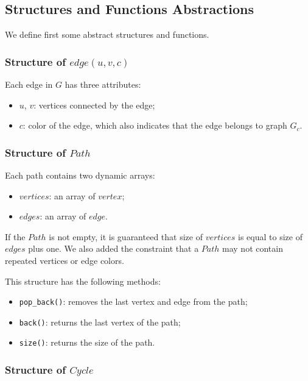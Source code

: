 \subsection{Structures and Functions Abstractions}


We define first some abstract structures and functions.

\subsubsection{Structure of $edge(u, v, c)$}

Each edge in $G$ has three attributes:

\begin{itemize}
    \item $u$, $v$: vertices connected by the edge;
    \item $c$: color of the edge, which also indicates that the edge belongs to graph $G_c$.
\end{itemize}

\subsubsection{Structure of $Path$}

Each path contains two dynamic arrays:

\begin{itemize}
    \item $vertices$: an array of $vertex$;
    \item $edges$: an array of $edge$.
\end{itemize}

If the $Path$ is not empty, it is guaranteed that size of 
$vertices$ is equal to size of $edges$ plus one. We 
also added the constraint that a $Path$ may not contain repeated 
vertices or edge colors.

This structure has the following methods:

\begin{itemize}
    \item \texttt{pop\_back()}: removes the last vertex and edge from the path;
    \item \texttt{back()}: returns the last vertex of the path;
    \item \texttt{size()}: returns the size of the path.
\end{itemize}

\subsubsection{Structure of $Cycle$}

